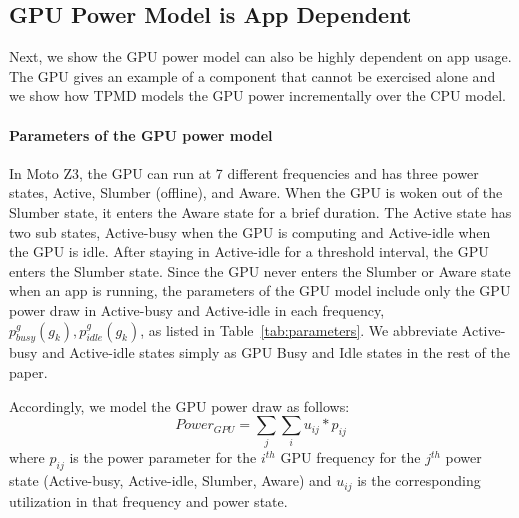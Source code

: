 \subsection{GPU Power Model is App Dependent}
\label{subsec:gpu}

Next, we show the GPU power model can also be highly dependent on app usage. 
The GPU gives an example of a component that cannot be exercised alone and we show
how TPMD models the GPU power incrementally over the CPU model.


\paragraph{Parameters of the GPU power model}
In Moto Z3, the GPU can run at 7 different frequencies and has three power states,
Active, Slumber (offline), and Aware.
When the GPU is woken out of the Slumber state, it enters the Aware state for a brief duration.
The Active state has two sub states, Active-busy when the GPU is computing and Active-idle
when the GPU is idle. After staying in Active-idle for a threshold interval, the GPU enters the Slumber state.
Since the GPU never enters the Slumber or Aware state when an app is running, 
the parameters of the GPU model include only the GPU power draw in Active-busy and Active-idle in each frequency, $p^g_{busy}(g_k), p^g_{idle}(g_k)$, as listed in Table~\ref{tab:parameters}.
We abbreviate Active-busy and Active-idle states simply
as GPU Busy and Idle states in the rest of the paper.

Accordingly, we model the GPU power draw as follows:
\begin{equation}
    Power_{GPU} = \sum_{j}\sum_{i} u_{ij}*p_{ij}
    \end{equation}
where $p_{ij}$ is the power parameter for the $i^{th}$ GPU frequency for the $j^{th}$ power state (Active-busy, Active-idle, Slumber, Aware) and $u_{ij}$ is the corresponding utilization in that frequency and power state.
\fi

